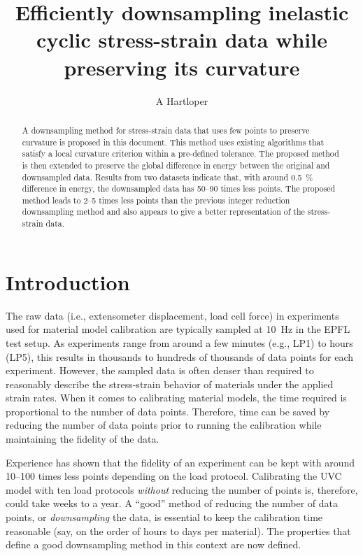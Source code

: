 \documentclass[a4paper,11pt]{article}
\title{Efficiently downsampling inelastic cyclic stress-strain data while preserving its curvature}
\author{A Hartloper}
\begin{document}
\maketitle

\begin{abstract}
    A downsampling method for stress-strain data that uses few points to preserve curvature is proposed in this document.
    This method uses existing algorithms that satisfy a local curvature criterion within a pre-defined tolerance.
    The proposed method is then extended to preserve the global difference in energy between the original and downsampled data.
    Results from two datasets indicate that, with around 0.5~\% difference in energy, the downsampled data has 50--90 times less points.
    The proposed method leads to 2--5 times less points than the previous integer reduction downsampling method and also appears to give a better representation of the stress-strain data.
\end{abstract}

\section{Introduction}

The raw data (i.e., extensometer displacement, load cell force) in experiments used for material model calibration are typically sampled at 10~Hz in the EPFL test setup.
As experiments range from around a few minutes (e.g., LP1) to hours (LP5), this results in thousands to hundreds of thousands of data points for each experiment.
However, the sampled data is often denser than required to reasonably describe the stress-strain behavior of materials under the applied strain rates.
When it comes to calibrating material models, the time required is proportional to the number of data points.
Therefore, time can be saved by reducing the number of data points prior to running the calibration while maintaining the fidelity of the data.

Experience has shown that the fidelity of an experiment can be kept with around 10--100 times less points depending on the load protocol.
Calibrating the UVC model with ten load protocols \emph{without} reducing the number of points is, therefore, could take weeks to a year.
A ``good'' method of reducing the number of data points, or \emph{downsampling} the data, is essential to keep the calibration time reasonable (say, on the order of hours to days per material).
The properties that define a good downsampling method in this context are now defined.
\end{document}
